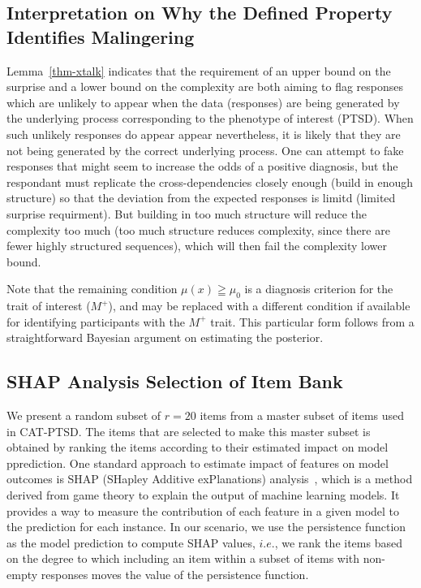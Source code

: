 \documentclass[onecolumn,10pt]{IEEEtran}
\begin{document}
\subsection*{Interpretation on Why the Defined Property Identifies Malingering}

Lemma~\ref{thm-xtalk} indicates that the requirement of  an upper bound on the surprise  and a lower bound on the complexity  are  both aiming to flag responses which are   unlikely to appear when the data (responses) are being generated by the  underlying process  corresponding to the phenotype of interest (PTSD).   When such unlikely responses do appear appear nevertheless, it is likely that they  are not being generated by the correct underlying process.  One can attempt to fake responses that might seem to increase the odds of a positive diagnosis, but the respondant must replicate the cross-dependencies closely enough (build in enough structure) so that the deviation from the expected responses is limitd (limited surprise requirment). But building in too much structure will reduce the complexity too much (too much structure reduces complexity, since there are fewer highly structured sequences), which will then fail the complexity lower bound.

Note that the remaining condition $\mu(x) \geqq \mu_0$ is a diagnosis criterion for the trait of interest ($M^+$), and may be replaced with a different condition if available for identifying participants with  the $M^+$ trait. This particular form follows from a straightforward Bayesian argument on estimating the posterior.

\subsection*{SHAP Analysis Selection of Item Bank}
We present a random subset of $r=20$ items from a master subset of items used in CAT-PTSD. The items that are selected to make this master subset is obtained by ranking the items according to their estimated impact on model pprediction. One standard approach to estimate impact of features on model outcomes is SHAP  (SHapley Additive exPlanations) analysis~\cite{lundberg2017unified}, which is a method derived from game theory to explain the output of machine learning models. It provides a way to measure the contribution of each feature in a given model to the prediction for each instance. In our scenario, we use the persistence function as the model prediction to compute SHAP values, $i.e.$, we rank the items based on the degree to which including an item within a subset of  items with non-empty responses moves the value of the persistence function.
\end{document}
